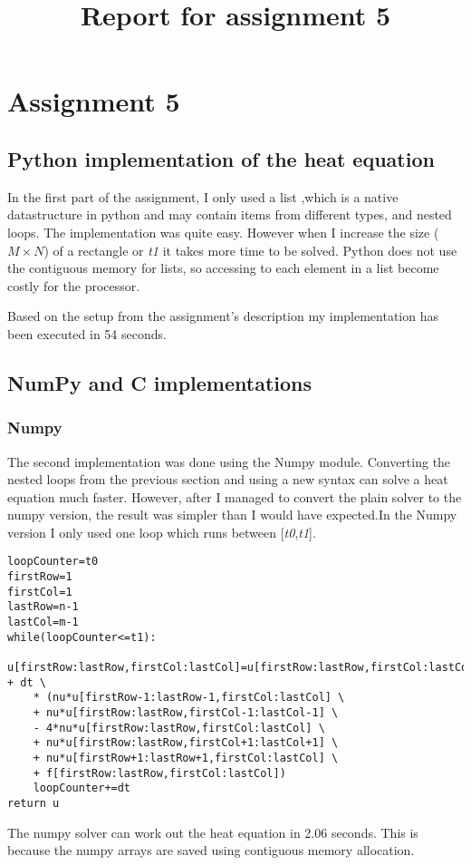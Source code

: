 \documentclass{article}
\title{Report for assignment 5}
\begin{document}
\section{Assignment 5}
\subsection{Python implementation of the heat equation}
In the first part of the assignment, I only used a list ,which is a native datastructure in python and may contain items from different types, and nested loops. The implementation was quite easy. However when I increase the size ($M\times N$)  of a rectangle or \textit{t1} it takes more time to be solved. Python does not use the contiguous memory for lists, so accessing to each element in a list become costly for the processor. 
\par

Based on the setup from the assignment's description my implementation has been executed in 54 seconds.

\subsection{NumPy and C implementations}
\subsubsection{Numpy}
The second implementation was done using the Numpy module. Converting the nested loops from the previous section and using a new syntax can solve a heat equation much faster. However, after I managed to convert the plain solver to the numpy version, the result was simpler than I would have expected.In the Numpy version I only used one loop which runs between 
[\textit{t0},\textit{t1}].

\begin{verbatim}
loopCounter=t0
firstRow=1
firstCol=1
lastRow=n-1       
lastCol=m-1
while(loopCounter<=t1):
    u[firstRow:lastRow,firstCol:lastCol]=u[firstRow:lastRow,firstCol:lastCol] + dt \
    * (nu*u[firstRow-1:lastRow-1,firstCol:lastCol] \
    + nu*u[firstRow:lastRow,firstCol-1:lastCol-1] \
    - 4*nu*u[firstRow:lastRow,firstCol:lastCol] \
    + nu*u[firstRow:lastRow,firstCol+1:lastCol+1] \
    + nu*u[firstRow+1:lastRow+1,firstCol:lastCol] \
    + f[firstRow:lastRow,firstCol:lastCol])  
    loopCounter+=dt
return u
\end{verbatim}

\par
The numpy solver can work out the heat equation in 2.06 seconds. This is because the numpy arrays are saved using contiguous memory allocation. 
\end{document}
